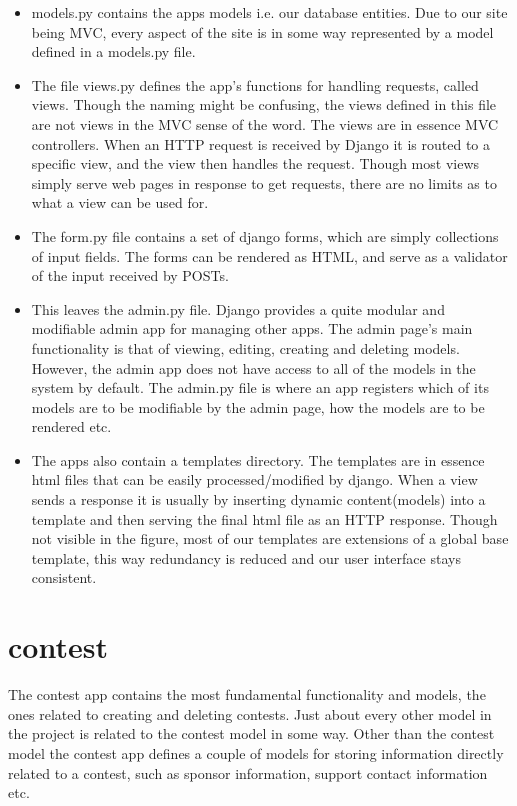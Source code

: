 \begin{itemize}
\item models.py contains the apps models i.e. our database entities. Due
to our site being MVC, every aspect of the site is in some way
represented by a model defined in a models.py file.

\item The file views.py defines the app{\textquoteright}s functions for
handling requests, called views. Though the naming might be confusing,
the views defined in this file are not views in the MVC sense of the
word. The views are in essence MVC controllers. When an HTTP request is
received by Django it is routed to a specific view, and the view then
handles the request. Though most views simply serve web pages in
response to get requests, there are no limits as to what a view can be
used for. 
\item The form.py file contains a set of django forms, which are simply
collections of input fields. The forms can be rendered as HTML, and
serve as a validator of the input received by POSTs. 

\item This leaves the admin.py file. Django provides a quite modular and
modifiable admin app for managing other apps. The admin
page{\textquoteright}s main functionality is that of viewing, editing,
creating and deleting models. However, the admin app does not have
access to all of the models in the system by default. The admin.py file
is where an app registers which of its models are to be modifiable by
the admin page, how the models are to be rendered etc.

\item The apps also contain a templates directory. The templates are in
essence html files that can be easily processed/modified by django.
When a view sends a response it is usually by inserting dynamic
content(models) into a template and then serving the final html file as
an HTTP response. Though not visible in the figure, most of our
templates are extensions of a global base template, this way redundancy
is reduced and our user interface stays consistent.
\end{itemize}

\bigskip

\section{contest}
The contest app contains the most fundamental functionality and models,
the ones related to creating and deleting contests. Just about every
other model in the project is related to the contest model in some way.
Other than the contest model the contest app defines a couple of models
for storing information directly related to a contest, such as sponsor
information, support contact information etc. 


